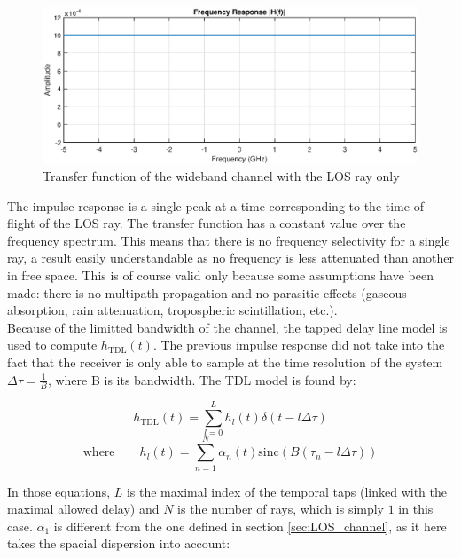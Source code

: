 \documentclass[10pt,a4paper]{ULBreport}
\begin{document}
\begin{figure}[H]
    \centering
    \includegraphics[width=1\textwidth]{4_1_freq.eps}
    \caption{Transfer function of the wideband channel with the LOS ray only}
    \label{fig:transfer_function}
\end{figure}

The impulse response is a single peak at a time corresponding to the time of flight of the LOS ray. The transfer function has a constant value over the frequency spectrum. This means that there is no frequency selectivity for a single ray, a result easily understandable as no frequency is less attenuated than another in free space. This is of course valid only because some assumptions have been made: there is no multipath propagation and no parasitic effects (gaseous absorption, rain attenuation, tropospheric scintillation, etc.).\\
Because of the limitted bandwidth of the channel, the tapped delay line model is used to compute $h_{\text{TDL}}(t)$. The previous impulse response did not take into the fact that the receiver is only able to sample at the time resolution of the system $\Delta\tau = \frac{1}{B}$, where B is its bandwidth. The TDL model is found by:

\begin{equation}
    h_{\text{TDL}}(t) = \sum_{l=0}^{L} h_l(t) \delta(t - l\Delta\tau)
    \label{eq:h_TDL}
\end{equation}
\begin{equation*}
    \text{where} \qquad h_l(t) = \sum_{n=1}^{N} \alpha_n(t) \text{sinc}\left(B(\tau_n - l\Delta\tau)\right)
\end{equation*}

In those equations, $L$ is the maximal index of the temporal taps (linked with the maximal allowed delay) and $N$ is the number of rays, which is simply $1$ in this case. $\alpha_1$ is different from the one defined in section \ref{sec:LOS_channel}, as it here takes the spacial dispersion into account:
\end{document}
